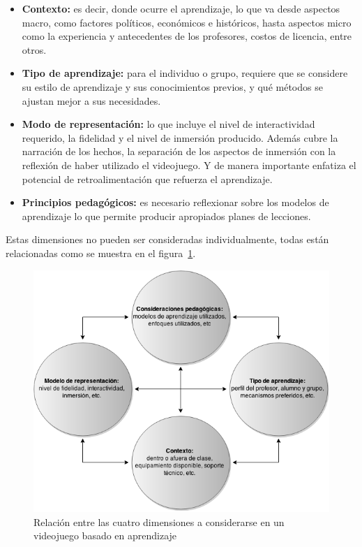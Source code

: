 \begin{itemize}
\item \textbf{Contexto:} es decir, donde ocurre el aprendizaje, lo que va desde
    aspectos macro, como  factores políticos, económicos e históricos, hasta
    aspectos micro como la experiencia y  antecedentes de los profesores, costos
    de licencia, entre otros.
\item \textbf{Tipo de aprendizaje:} para el individuo o grupo, requiere que se
    considere su  estilo de aprendizaje y sus conocimientos previos, y qué
    métodos se ajustan mejor a sus  necesidades.
\item \textbf{Modo de representación:} lo que incluye el nivel de interactividad
    requerido, la fidelidad y  el nivel de inmersión producido. Además cubre la
    narración de los hechos, la separación de los  aspectos de inmersión con la
    reflexión de haber utilizado el videojuego. Y de manera importante  enfatiza
    el potencial de retroalimentación que refuerza el aprendizaje.
\item \textbf{Principios pedagógicos:} es necesario reflexionar sobre los
    modelos de aprendizaje lo  que permite producir apropiados planes de
    lecciones.
\end{itemize}

Estas dimensiones no pueden ser consideradas individualmente, todas están
relacionadas  como se muestra en el figura~\ref{fig:desarrollo_dimensiones}.

\begin{figure}[H]
\centering
\includegraphics[scale=0.5]{juegos_serios/desarrollo_dimensiones.png}
\caption{Relación entre las cuatro dimensiones a considerarse en un videojuego
    basado en aprendizaje}
\label{fig:desarrollo_dimensiones}
\end{figure}

